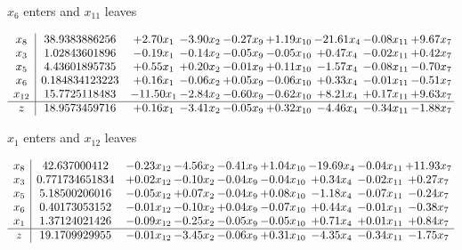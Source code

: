 \documentclass[8pt]{article}
\begin{document}
 $ x_{6} $ enters and $ x_{11} $ leaves 

 \[\begin{array}{c| c c@{\hskip 2pt} c@{\hskip 2pt} c@{\hskip 2pt} c@{\hskip 2pt} c@{\hskip 2pt} c@{\hskip 2pt} c@{\hskip 2pt} }
 x_{8}   &  38.9383886256 & +  2.70 x_{1} & -3.90 x_{2} & -0.27 x_{9} & +  1.19 x_{10} & -21.61 x_{4} & -0.08 x_{11} & +  9.67 x_{7}\\
 x_{3}   &  1.02843601896 & -0.19 x_{1} & -0.14 x_{2} & -0.05 x_{9} & -0.05 x_{10} & +  0.47 x_{4} & -0.02 x_{11} & +  0.42 x_{7}\\
 x_{5}   &  4.43601895735 & +  0.55 x_{1} & +  0.20 x_{2} & -0.01 x_{9} & +  0.11 x_{10} & -1.57 x_{4} & -0.08 x_{11} & -0.70 x_{7}\\
 x_{6}   &  0.184834123223 & +  0.16 x_{1} & -0.06 x_{2} & +  0.05 x_{9} & -0.06 x_{10} & +  0.33 x_{4} & -0.01 x_{11} & -0.51 x_{7}\\
 x_{12}   &  15.7725118483 & -11.50 x_{1} & -2.84 x_{2} & -0.60 x_{9} & -0.62 x_{10} & +  8.21 x_{4} & +  0.17 x_{11} & +  9.63 x_{7}\\
\hline
z    &  18.9573459716 & +  0.16 x_{1} & -3.41 x_{2} & -0.05 x_{9} & +  0.32 x_{10} & -4.46 x_{4} & -0.34 x_{11} & -1.88 x_{7}\\
\end{array}\]


 $ x_{1} $ enters and $ x_{12} $ leaves 

 \[\begin{array}{c| c c@{\hskip 2pt} c@{\hskip 2pt} c@{\hskip 2pt} c@{\hskip 2pt} c@{\hskip 2pt} c@{\hskip 2pt} c@{\hskip 2pt} }
 x_{8}   &  42.637000412 & -0.23 x_{12} & -4.56 x_{2} & -0.41 x_{9} & +  1.04 x_{10} & -19.69 x_{4} & -0.04 x_{11} & + 11.93 x_{7}\\
 x_{3}   &  0.771734651834 & +  0.02 x_{12} & -0.10 x_{2} & -0.04 x_{9} & -0.04 x_{10} & +  0.34 x_{4} & -0.02 x_{11} & +  0.27 x_{7}\\
 x_{5}   &  5.18500206016 & -0.05 x_{12} & +  0.07 x_{2} & -0.04 x_{9} & +  0.08 x_{10} & -1.18 x_{4} & -0.07 x_{11} & -0.24 x_{7}\\
 x_{6}   &  0.40173053152 & -0.01 x_{12} & -0.10 x_{2} & +  0.04 x_{9} & -0.07 x_{10} & +  0.44 x_{4} & -0.01 x_{11} & -0.38 x_{7}\\
 x_{1}   &  1.37124021426 & -0.09 x_{12} & -0.25 x_{2} & -0.05 x_{9} & -0.05 x_{10} & +  0.71 x_{4} & +  0.01 x_{11} & +  0.84 x_{7}\\
\hline
z    &  19.1709929955 & -0.01 x_{12} & -3.45 x_{2} & -0.06 x_{9} & +  0.31 x_{10} & -4.35 x_{4} & -0.34 x_{11} & -1.75 x_{7}\\
\end{array}\]
\end{document}
